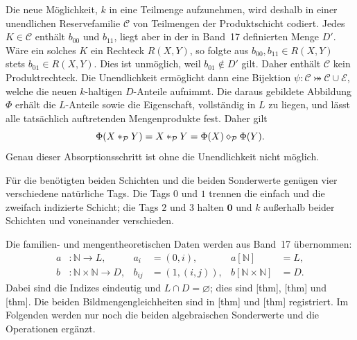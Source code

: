\documentclass[main.tex]{subfiles}
\begin{document}
\begin{remark}
Die neue Möglichkeit, \(k\) in eine Teilmenge aufzunehmen, wird deshalb in
einer unendlichen Reservefamilie \(\mathcal C\) von Teilmengen der
Produktschicht codiert. Jedes \(K\in\mathcal C\) enthält \(b_{00}\) und
\(b_{11}\), liegt aber in der in Band~17 definierten Menge \(D'\). Wäre ein
solches \(K\) ein Rechteck \(R(X,Y)\), so folgte aus
\(b_{00},b_{11}\in R(X,Y)\) stets \(b_{01}\in R(X,Y)\). Dies ist unmöglich,
weil \(b_{01}\notin D'\) gilt. Daher enthält \(\mathcal C\) kein
Produktrechteck.
Die Unendlichkeit ermöglicht dann eine Bijektion
\(\psi\colon\mathcal C\bij\mathcal C\cup\mathcal E\), welche die neuen
\(k\)-haltigen \(D\)-Anteile aufnimmt. Die daraus gebildete Abbildung \(\Phi\)
erhält die \(L\)-Anteile sowie die Eigenschaft, vollständig in \(L\) zu liegen,
und lässt alle tatsächlich auftretenden Mengenprodukte fest. Daher gilt
\[
  \Phi(X\mathbin{\ast}_{\mathcal P}Y)
  =X\mathbin{\ast}_{\mathcal P}Y
  =\Phi(X)\mathbin{\diamond}_{\mathcal P}\Phi(Y).
\]
Genau dieser Absorptionsschritt ist ohne die Unendlichkeit nicht möglich.
\end{remark}

Für die benötigten beiden Schichten und die beiden Sonderwerte genügen
vier verschiedene natürliche Tags. Die Tags \(0\) und \(1\) trennen die
einfach und die zweifach indizierte Schicht; die Tags \(2\) und \(3\) halten
\(\mathbf0\) und \(k\) außerhalb beider Schichten und voneinander verschieden.

Die familien- und mengentheoretischen Daten werden aus Band~17 übernommen:
\begin{align*}
  a&\colon\mathbb N\to L,
  &a_i&=(0,i),
  &a[\mathbb N]&=L,\\[-2pt]
  b&\colon\mathbb N\times\mathbb N\to D,
  &b_{ij}&=(1,(i,j)),
  &b[\mathbb N\times\mathbb N]&=D.
\end{align*}
Dabei sind die Indizes eindeutig und \(L\cap D=\varnothing\); dies sind
[thm],
[thm] und
[thm]. Die beiden
Bildmengengleichheiten sind in
[thm] und
[thm] registriert. Im Folgenden werden nur
noch die beiden algebraischen Sonderwerte und die Operationen ergänzt.


\end{document}
